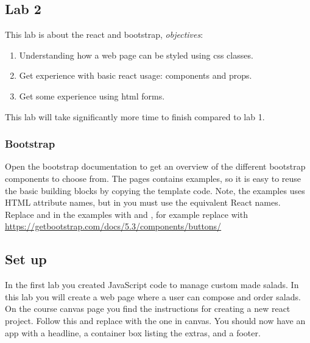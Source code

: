 \documentclass[fleqn, article, a4paper]{memoir}
\begin{document}
\maketitle
\thispagestyle{titlepage}
\vspace{-4cm}

\subsection*{Lab 2}

\n This lab is about the react and bootstrap, \emph{objectives}:

\begin{enumerate}\firmlist
\item Understanding how a web page can be styled using css classes.
\item Get experience with basic react usage: components and props.
\item Get some experience using html forms.
\end{enumerate}
\noindent This lab will take significantly more time to finish compared to lab 1.
\subsubsection*{Bootstrap}
Open the bootstrap documentation to get an overview of the different bootstrap components to choose from. The pages contains examples, so it is easy to reuse the basic building blocks by copying the template code. Note, the examples uses HTML attribute names, but in you must use the equivalent React names. Replace  and  in the examples with  and , for example replace  with 
\\ \url{https://getbootstrap.com/docs/5.3/components/buttons/}

\subsection*{Set up}

In the first lab you created JavaScript code to manage custom made salads. In this lab you will create a web page where a user can compose and order salads. On the course canvas page you find the instructions for creating a new react project. Follow this and replace  with the one in canvas. You should now have an app with a headline, a container box listing the extras, and a footer.
\end{document}
